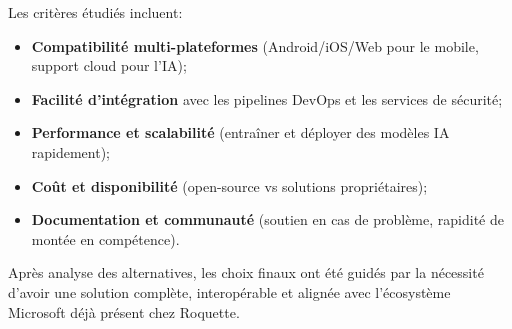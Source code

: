 \documentclass[12pt,a4paper]{report}
\begin{document}
\noindent
Les critères étudiés incluent:
\begin{itemize}
    \item \textbf{Compatibilité multi-plateformes} (Android/iOS/Web pour le mobile, support cloud pour l’IA);
    \item \textbf{Facilité d’intégration} avec les pipelines DevOps et les services de sécurité;
    \item \textbf{Performance et scalabilité} (entraîner et déployer des modèles IA rapidement);
    \item \textbf{Coût et disponibilité} (open-source vs solutions propriétaires);
    \item \textbf{Documentation et communauté} (soutien en cas de problème, rapidité de montée en compétence).
\end{itemize}

Après analyse des alternatives, les choix finaux ont été guidés par la nécessité
d’avoir une solution complète, interopérable et alignée avec l’écosystème Microsoft
déjà présent chez Roquette.
\end{document}
